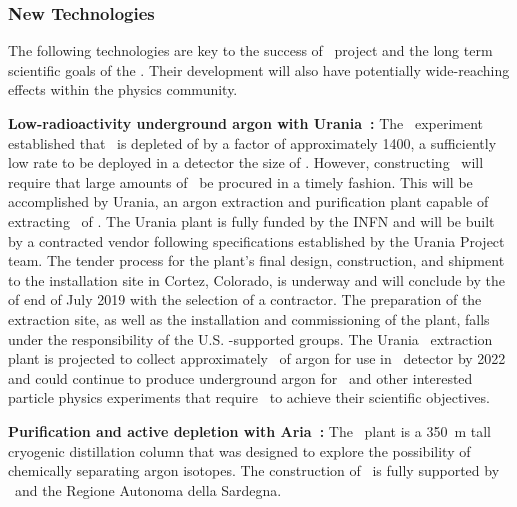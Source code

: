 \subsubsection{New Technologies}
\label{sec:technologies}

The following technologies are key to the success of \DSk\ project and the long term scientific goals of the \GADMC. Their development will also have potentially wide-reaching effects within the physics community.

{\bf Low-radioactivity underground argon with Urania~\cite{Aalseth:2018gq}:} 
The \DSfs\ experiment established that \UAr\ is depleted of  by a factor of approximately 1400, a sufficiently low rate to be deployed in a detector the size of \DSks. However, constructing \DSks\ will require that large amounts of \UAr\ be procured in a timely fashion. This will be accomplished by Urania, an argon extraction and purification plant capable of extracting \UraniaUArRate\ of \UAr.  The Urania plant is fully funded by the INFN and will be built by a contracted vendor following specifications established by the Urania Project team. The tender process for the plant's final design, construction, and shipment to the installation site in Cortez, Colorado, is underway and will conclude by the of end of July 2019 with the selection of a contractor.  The preparation of the extraction site, as well as the installation and commissioning of the plant, falls under the responsibility of the U.S. \NSF-supported groups.  The Urania \UAr\ extraction plant is projected to collect approximately \UraniaTotalDSkProduction\ of argon for use in \DSks\ detector by 2022 and could continue to produce underground argon for \Argo\ and other interested particle physics experiments that require \UAr\ to achieve their scientific objectives.  

{\bf Purification and active depletion with Aria~\cite{Aalseth:2018gq}:}
The \Aria\ plant is a \SI{350}{\m} tall cryogenic distillation column that was designed to explore the possibility of chemically separating argon isotopes.  The construction of \Aria\ is fully supported by \INFN\ and the Regione Autonoma della Sardegna. 

